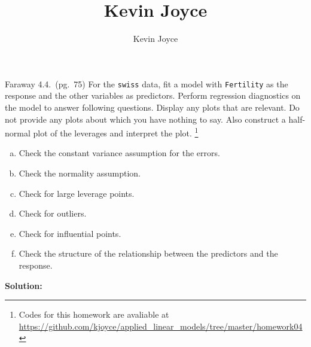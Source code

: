 \documentclass{homework}
\title{Kevin Joyce}
\author{Kevin Joyce}
\begin{document}
 
\newcommand{\figref}[1]{\figurename~\ref{#1}}
\renewcommand{\bar}{\overline}
\renewcommand{\hat}{\widehat}
\renewcommand{\SS}{\mathcal S}
\newcommand{\HH}{\mathscr H}
\newcommand{\mom}{\widetilde}
\newcommand{\mle}{\widehat \Uptheta}
\newcommand{\eps}{\varepsilon}
\newcommand{\todist}{\stackrel{D}\longrightarrow}
\newcommand{\toprob}{\stackrel{p}\longrightarrow}
\newcommand{\TTheta}{\overline{\underline \Theta} }
\newcommand{\del}{\partial}
\newcommand{\approxsim}{\overset{\cdotp}{\underset{\cdotp}{\sim}}}
\newcommand{\RSS}{\ensuremath{\mathrm{RSS}}}
\newcommand{\MSE}{\ensuremath{\mathrm{MSE}}}
\newcommand{\SE}{\ensuremath{\mathrm{SE}}}
\newcommand{\TSS}{\ensuremath{\mathrm{TSS}}}
\newcommand{\SSReg}{\ensuremath{\mathrm{SSReg}}}
\renewcommand{\a}[1]{{\color{red} \it #1}}


\begin{longproblem} Faraway 4.4.~(pg.~75) For the \texttt{swiss} data, fit a model with
\texttt{Fertility} as the response and the other variables as predictors. Perform regression diagnostics on the model to answer following questions.  Display any plots that are relevant.  Do not provide any plots about which you have nothing to say.
Also construct a half-normal plot of the
leverages and interpret the plot. 
\footnote{Codes for this homework are avaliable at \url{https://github.com/kjoyce/applied_linear_models/tree/master/homework04}}
\begin{enumerate}[(a)]
  \item Check the constant variance assumption for the errors.
  \item Check the normality assumption.
  \item Check for large leverage points.
  \item Check for outliers.
  \item Check for influential points.
  \item Check the structure of the relationship between the predictors and the response.
\end{enumerate}

\textbf{Solution: }


\end{longproblem}
\end{document}
